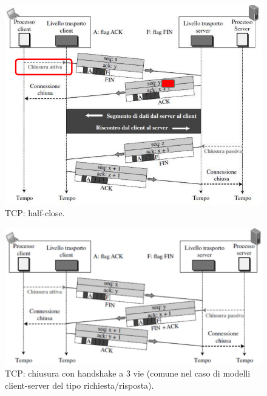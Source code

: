 \documentclass[11pt, italian, openany]{book}
\begin{document}
\begin{sloppypar}
\begin{figure}[!h]
	\centering
	\includegraphics[scale=0.5]{images/tcp-half-close.png}
	\caption{TCP: half-close.}
	\label{fig:tcp-half-close}
\end{figure}

\pagebreak

\begin{figure}[!h]
	\centering
	\includegraphics[scale=0.35]{images/tcp-chiusura-3way-handshake.png}
	\caption{TCP: chiusura con handshake a 3 vie (comune nel caso di modelli client-server del tipo richiesta/risposta).}
	\label{fig:chiusura-3way}
\end{figure}


\end{sloppypar}
\end{document}
